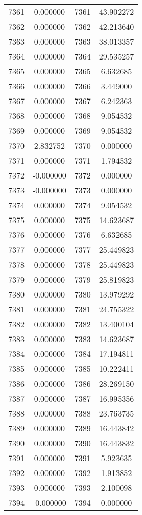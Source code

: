 \documentclass[12pt]{article}
\begin{document}
\begin{longtable}{@{}cccc@{}}
7361 & 0.000000 & 7361 & 43.902272 \\
7362 & 0.000000 & 7362 & 42.213640 \\
7363 & 0.000000 & 7363 & 38.013357 \\
7364 & 0.000000 & 7364 & 29.535257 \\
7365 & 0.000000 & 7365 & 6.632685 \\
7366 & 0.000000 & 7366 & 3.449000 \\
7367 & 0.000000 & 7367 & 6.242363 \\
7368 & 0.000000 & 7368 & 9.054532 \\
7369 & 0.000000 & 7369 & 9.054532 \\
7370 & 2.832752 & 7370 & 0.000000 \\
7371 & 0.000000 & 7371 & 1.794532 \\
7372 & -0.000000 & 7372 & 0.000000 \\
7373 & -0.000000 & 7373 & 0.000000 \\
7374 & 0.000000 & 7374 & 9.054532 \\
7375 & 0.000000 & 7375 & 14.623687 \\
7376 & 0.000000 & 7376 & 6.632685 \\
7377 & 0.000000 & 7377 & 25.449823 \\
7378 & 0.000000 & 7378 & 25.449823 \\
7379 & 0.000000 & 7379 & 25.819823 \\
7380 & 0.000000 & 7380 & 13.979292 \\
7381 & 0.000000 & 7381 & 24.755322 \\
7382 & 0.000000 & 7382 & 13.400104 \\
7383 & 0.000000 & 7383 & 14.623687 \\
7384 & 0.000000 & 7384 & 17.194811 \\
7385 & 0.000000 & 7385 & 10.222411 \\
7386 & 0.000000 & 7386 & 28.269150 \\
7387 & 0.000000 & 7387 & 16.995356 \\
7388 & 0.000000 & 7388 & 23.763735 \\
7389 & 0.000000 & 7389 & 16.443842 \\
7390 & 0.000000 & 7390 & 16.443832 \\
7391 & 0.000000 & 7391 & 5.923635 \\
7392 & 0.000000 & 7392 & 1.913852 \\
7393 & 0.000000 & 7393 & 2.100098 \\
7394 & -0.000000 & 7394 & 0.000000 \\

\end{longtable}
\end{document}
